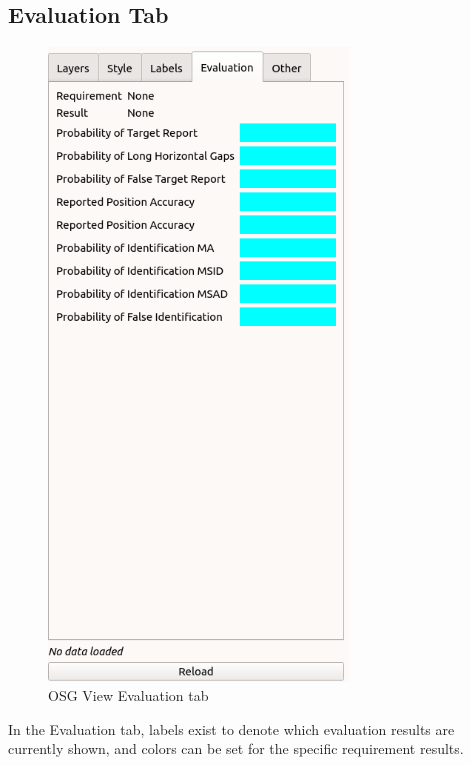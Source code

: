 \subsection{Evaluation Tab}
\label{sec:osgview_eval_tab} 

\begin{figure}[H]
   \center
    \includegraphics[width=8cm,frame]{figures/osgview_eval_tab.png}
  \caption{OSG View Evaluation tab}
\end{figure}

In the Evaluation tab, labels exist to denote which evaluation results are currently shown, and colors can be set for the specific requirement results.
